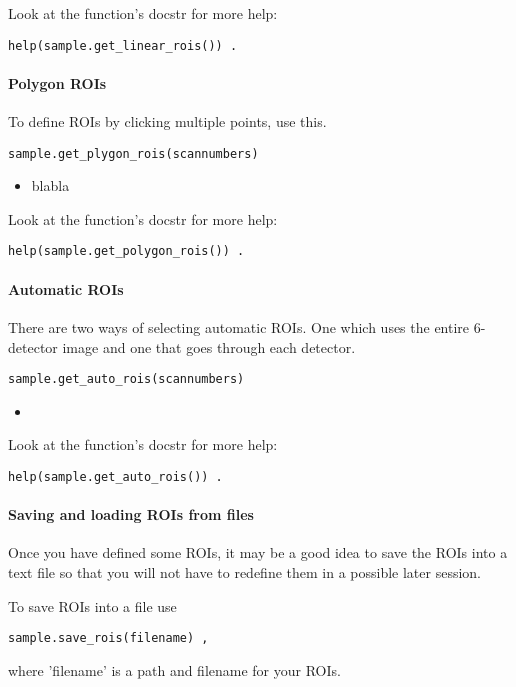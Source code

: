 \documentclass[aps,prl,groupedaddress]{revtex4}
\begin{document}
Look at the function's docstr for more help:
\begin{lstlisting}[frame=single]
help(sample.get_linear_rois()) .
\end{lstlisting}

\paragraph{Polygon ROIs}
To define ROIs by clicking multiple points, use this.
\begin{lstlisting}[frame=single]
sample.get_plygon_rois(scannumbers)
\end{lstlisting}

\begin{itemize}
 \item blabla
\end{itemize}

Look at the function's docstr for more help:
\begin{lstlisting}[frame=single]
help(sample.get_polygon_rois()) .
\end{lstlisting}


\paragraph{Automatic ROIs}
There are two ways of selecting automatic ROIs. One which uses the entire 6-detector image and one that goes through each detector.
\begin{lstlisting}[frame=single]
sample.get_auto_rois(scannumbers)
\end{lstlisting}

\begin{itemize}
 \item
\end{itemize}

Look at the function's docstr for more help:
\begin{lstlisting}[frame=single]
help(sample.get_auto_rois()) .
\end{lstlisting}

\paragraph{Saving and loading ROIs from files}
Once you have defined some ROIs, it may be a good idea to save the ROIs into a text file so that you will not have to redefine them in a possible later session.

To save ROIs into a file use
\begin{lstlisting}[frame=single]
sample.save_rois(filename) ,
\end{lstlisting}
where 'filename' is a path and filename for your ROIs.
\end{document}
